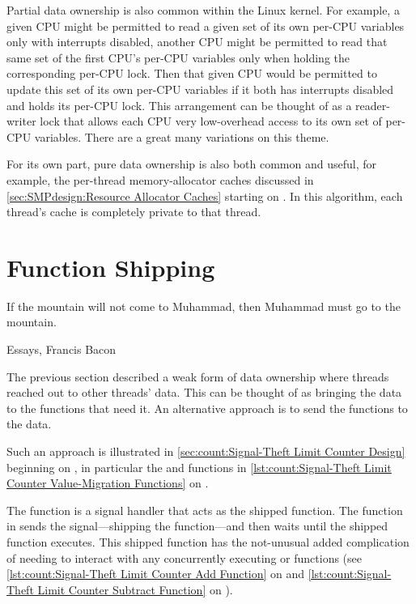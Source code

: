 Partial data ownership is also common within the Linux kernel.
For example, a given CPU might be permitted to read a given set of its
own per-CPU variables only with interrupts disabled, another CPU might
be permitted to read that same set of the first CPU's per-CPU variables
only when holding the corresponding per-CPU lock.
Then that given CPU would be permitted to update this set of its own
per-CPU variables if it both has interrupts disabled and holds its
per-CPU lock.
This arrangement can be thought of as a reader-writer lock that allows
each CPU very low-overhead access to its own set of per-CPU variables.
There are a great many variations on this theme.

For its own part, pure data ownership is also both common and useful,
for example, the per-thread memory-allocator caches discussed in
\cref{sec:SMPdesign:Resource Allocator Caches}
starting on
.
In this algorithm, each thread's cache is completely private to that
thread.

\section{Function Shipping}
\label{sec:owned:Function Shipping}
%
\epigraph{If the mountain will not come to Muhammad, then Muhammad must
	  go to the mountain.}
	 {Essays, Francis Bacon}

The previous section described a weak form of data ownership where
threads reached out to other threads' data.
This can be thought of as bringing the data to the functions that
need it.
An alternative approach is to send the functions to the data.

Such an approach is illustrated in
\cref{sec:count:Signal-Theft Limit Counter Design}
beginning on
,
in particular the  and
 functions in
\cref{lst:count:Signal-Theft Limit Counter Value-Migration Functions}
on
.

The  function is a signal handler that
acts as the shipped function.
The  function in 
sends the signal---shipping the function---and then waits until
the shipped function executes.
This shipped function has the not-unusual added complication of
needing to interact with any concurrently executing 
or  functions (see
\cref{lst:count:Signal-Theft Limit Counter Add Function}
on
 and
\cref{lst:count:Signal-Theft Limit Counter Subtract Function}
on
).

